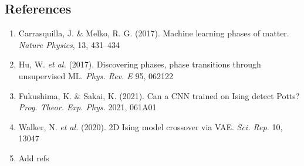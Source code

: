 \documentclass[%
oneside,                 %
final,                   %
10pt]{article}
\begin{document}
\noindent
\subsection{References}
\begin{enumerate}
\item Carrasquilla, J. \& Melko, R. G. (2017). Machine learning phases of matter. \emph{Nature Physics}, 13, 431–434 

\item Hu, W. \textit{et al.} (2017). Discovering phases, phase transitions through unsupervised ML. \emph{Phys. Rev. E} 95, 062122 

\item Fukushima, K. \& Sakai, K. (2021). Can a CNN trained on Ising detect Potts? \emph{Prog. Theor. Exp. Phys.} 2021, 061A01 

\item Walker, N. \textit{et al.} (2020). 2D Ising model crossover via VAE. \emph{Sci. Rep.} 10, 13047

\item Add refs
\end{enumerate}

\noindent


\end{document}
